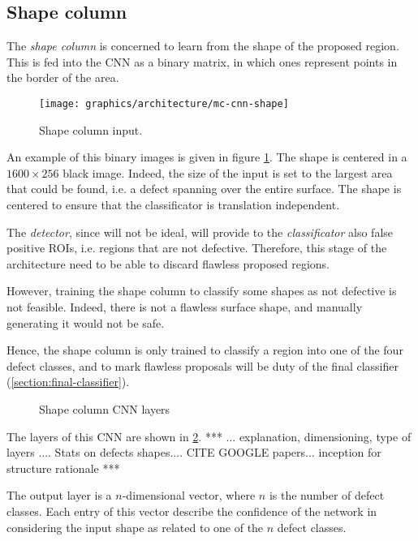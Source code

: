     \subsection{Shape column}\label{section:shape-column}
        \par{
            The \emph{shape column} is concerned to learn from the shape of the proposed region. This is fed into the CNN as a binary matrix, in which ones represent points in the border of the area.
        }
        \begin{figure}
            \centering
            \texttt{[image: graphics/architecture/mc-cnn-shape]}
            \caption{Shape column input.}\label{fig:mc-cnn:shape-input}
        \end{figure}
        \par{
            An example of this binary images is given in figure \ref{fig:mc-cnn:shape-input}. The shape is centered in a $1600\times 256$ black image. Indeed, the size of the input is set to the largest area that could be found, i.e. a defect spanning over the entire surface. The shape is centered to ensure that the classificator is translation independent. 
        }
        \par{
            The \emph{detector}, since will not be ideal, will provide to the \emph{classificator} also false positive ROIs, i.e. regions that are not defective. Therefore, this stage of the architecture need to be able to discard flawless proposed regions.
        }
        \par{
            However, training the shape column to classify some shapes as not defective is not feasible. Indeed, there is not a flawless surface shape, and manually generating it would not be safe.
        }
        \par{
            Hence, the shape column is only trained to classify a region into one of the four defect classes, and to mark flawless proposals will be duty of the final classifier (\ref{section:final-classifier}).
        }
        \begin{figure}
            \centering
            \caption{Shape column CNN layers}\label{fig:mc-cnn:shape-structure}
        \end{figure}
        \par{
            The layers of this CNN are shown in \ref{fig:mc-cnn:shape-structure}. *** ... explanation, dimensioning, type of layers .... Stats on defects shapes.... CITE GOOGLE papers... inception for structure rationale ***
        }
        \par{
            The output layer is a $n$-dimensional vector, where $n$ is the number of defect classes. Each entry of this vector describe the confidence of the network in considering the input shape as related to one of the $n$ defect classes.
        }
